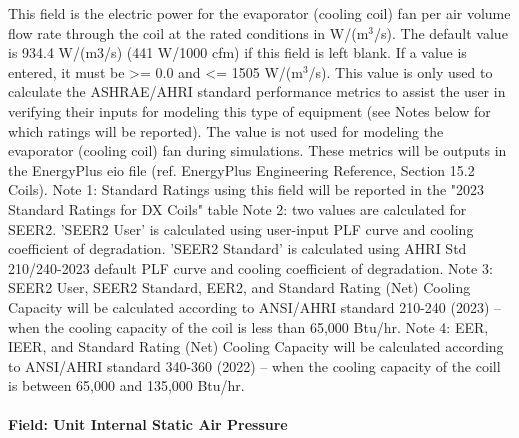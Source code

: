 This field is the electric power for the evaporator (cooling coil) fan per air volume flow rate through the coil at the rated conditions in W/(m\(^{3}\)/s). The default value is 934.4 W/(m3/s) (441 W/1000 cfm) if this field is left blank. If a value is entered, it must be \textgreater{}= 0.0 and \textless{}= 1505 W/(m\(^{3}\)/s). This value is only used to calculate the ASHRAE/AHRI standard performance metrics to assist the user in verifying their inputs for modeling this type of equipment (see Notes below for which ratings will be reported).  The value is not used for modeling the evaporator (cooling coil) fan during simulations.
These metrics will be outputs in the EnergyPlus eio file (ref. EnergyPlus Engineering Reference, Section 15.2 Coils). 
Note 1: Standard Ratings using this field will be reported in the "2023 Standard Ratings for DX Coils" table
Note 2: two values are calculated for SEER2. 'SEER2 User' is calculated using user-input PLF curve and cooling coefficient of degradation. 'SEER2 Standard' is calculated using AHRI Std 210/240-2023 default PLF curve and cooling coefficient of degradation.
Note 3: SEER2 User, SEER2 Standard, EER2, and Standard Rating (Net) Cooling Capacity will be calculated according to ANSI/AHRI standard 210-240 (2023) -- when the cooling capacity of the coil is less than 65,000 Btu/hr.
Note 4: EER, IEER, and Standard Rating (Net) Cooling Capacity will be calculated according to ANSI/AHRI standard 340-360 (2022) -- when the cooling capacity of the coill is between 65,000 and 135,000 Btu/hr.

\paragraph{Field: Unit Internal Static Air Pressure}\label{field-unit-internal-static-air-pressure}

